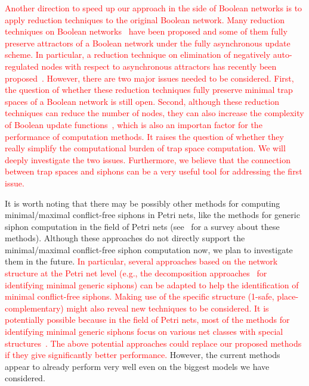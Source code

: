 \documentclass[preprint,12pt]{elsarticle}
\newcommand{\change}[1]{\textcolor{red}{#1}}
\begin{document}
\change{Another direction to speed up our approach in the side of Boolean networks is to apply reduction techniques to the original Boolean network.
Many reduction techniques on Boolean networks~\cite{DBLP:journals/tcs/NaldiRTC11,schwieger2023reduction} have been proposed and some of them fully preserve attractors of a Boolean network under the fully asynchronous update scheme.
In particular, a reduction technique on elimination of negatively auto-regulated nodes with respect to asynchronous attractors has recently been proposed~\cite{schwieger2023reduction}.
However, there are two major issues needed to be considered.
First, the question of whether these reduction techniques fully preserve minimal trap spaces of a Boolean network is still open.
Second, although these reduction techniques can reduce the number of nodes, they can also increase the complexity of Boolean update functions~\cite{DBLP:journals/tcs/NaldiRTC11}, which is also an importan factor for the performance of computation methods.
It raises the question of whether they really simplify the computational burden of trap space computation.
We will deeply investigate the two issues.
Furthermore, we believe that the connection between trap spaces and siphons can be a very useful tool for addressing the first issue.
}

It is worth noting that there may be possibly other methods for computing minimal/maximal conflict-free siphons in Petri nets, like the methods for generic siphon computation in the field of Petri nets (see~\cite{DBLP:journals/isci/LiuB16} for a survey about these methods).
Although these approaches do not directly support the minimal/maximal conflict-free siphon computation now, we plan to investigate them in the future.
\change{
In particular, several approaches based on the network structure at the Petri net level (e.g., the decomposition approaches~\cite{DBLP:journals/tsmc/CordoneFP05,DBLP:journals/ieeejas/YouKW22} for identifying minimal generic siphons) can be adapted to help the identification of minimal conflict-free siphons.
Making use of the specific structure (1-safe, place-complementary) might also reveal new techniques to be considered.
It is potentially possible because in the field of Petri nets, most of the methods for identifying minimal generic siphons focus on various net classes with special structures~\cite{DBLP:journals/isci/LiuB16}.
The above potential approaches could replace our proposed methods if they give significantly better performance.}
However, the current methods appear to already perform very well even on the biggest models we have considered.
\end{document}
